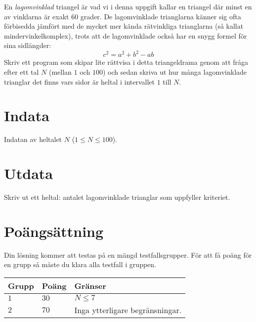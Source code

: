 En \emph{lagomvinklad} triangel är vad vi i denna uppgift kallar en triangel där minst en av vinklarna är exakt 60 grader. De lagomvinklade trianglarna känner sig ofta förbisedda jämfört med de mycket mer kända rätvinkliga trianglarna (så kallat mindervinkelkomplex), trots att de lagomvinklade också har en snygg formel för sina sidlängder:
\begin{equation*}
	c^2 = a^2 + b^2 - ab
\end{equation*}
Skriv ett program som skipar lite rättvisa i detta triangeldrama genom att fråga efter ett tal $N$ (mellan $1$ och $100$) och sedan skriva ut hur många lagomvinklade trianglar det finns vars sidor är heltal i intervallet $1$ till $N$.

\section*{Indata}
Indatan av heltalet $N$ ($1 \leq N \leq 100$).

\section*{Utdata}
Skriv ut ett heltal: antalet lagomvinklade trianglar som uppfyller kriteriet.

\section*{Poängsättning}
Din lösning kommer att testas på en mängd testfallsgrupper.
För att få poäng för en grupp så måste du klara alla testfall i gruppen.

\noindent
\begin{tabular}{| l | l | p{12cm} |}
  \hline
  \textbf{Grupp} & \textbf{Poäng} & \textbf{Gränser} \\ \hline
  $1$    & $30$          & $N \leq 7$  \\ \hline
  $2$    & $70$          & Inga ytterligare begränsningar.  \\ \hline
\end{tabular}
